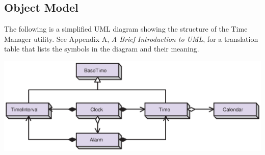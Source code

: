 
\pagebreak
\subsection{Object Model}

The following is a simplified UML diagram showing the structure of the
Time Manager utility.  See Appendix A, {\it A Brief Introduction to UML},
for a translation table that lists the symbols in the diagram and their 
meaning.

\begin{center}
\includegraphics{TimeMgr_obj.eps}   
\end{center}
